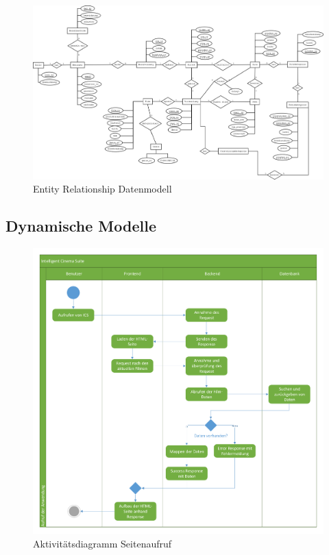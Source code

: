 			\begin{figure}[H]
				\centering 
				\includegraphics[width=15cm]{img/erModell.png}
				\captionsetup{format=hang}
				\caption[Entity Relationship Datenmodell]{\label{fig:erModell} Entity Relationship Datenmodell}
			\end{figure}
		
		\subsection{Dynamische Modelle}
			\begin{figure}[H]
				\centering 
				\includegraphics[width=15cm]{img/adSeitenaufruf.pdf}
				\captionsetup{format=hang}
				\caption[Aktivitätsdiagramm Seitenaufruf]{\label{fig:aktivitätSeitenaufruf} Aktivitätsdiagramm Seitenaufruf}
			\end{figure}
		
			
		